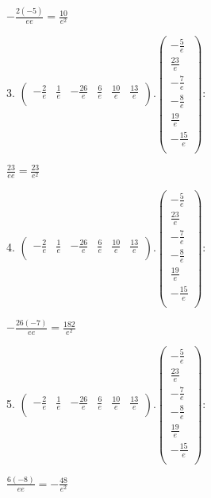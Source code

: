 \documentclass{article}
\begin{document}
$-\frac{2 (-5)}{e e}=\frac{10}{e^2}$

3. $\left(
\begin{array}{cccccc}
-\frac{2}{e} & \frac{1}{e} & -\frac{26}{e} & \frac{6}{e} & \frac{10}{e} & \frac{13}{e} \\
\end{array}
\right).\left(
\begin{array}{c}
-\frac{5}{e} \\
 \frac{23}{e} \\
 -\frac{7}{e} \\
 -\frac{8}{e} \\
 \frac{19}{e} \\
 -\frac{15}{e} \\
\end{array}
\right):$

$\frac{23}{e e}=\frac{23}{e^2}$

4. $\left(
\begin{array}{cccccc}
-\frac{2}{e} & \frac{1}{e} & -\frac{26}{e} & \frac{6}{e} & \frac{10}{e} & \frac{13}{e} \\
\end{array}
\right).\left(
\begin{array}{c}
-\frac{5}{e} \\
 \frac{23}{e} \\
 -\frac{7}{e} \\
 -\frac{8}{e} \\
 \frac{19}{e} \\
 -\frac{15}{e} \\
\end{array}
\right):$

$-\frac{26 (-7)}{e e}=\frac{182}{e^2}$

5. $\left(
\begin{array}{cccccc}
-\frac{2}{e} & \frac{1}{e} & -\frac{26}{e} & \frac{6}{e} & \frac{10}{e} & \frac{13}{e} \\
\end{array}
\right).\left(
\begin{array}{c}
-\frac{5}{e} \\
 \frac{23}{e} \\
 -\frac{7}{e} \\
 -\frac{8}{e} \\
 \frac{19}{e} \\
 -\frac{15}{e} \\
\end{array}
\right):$

$\frac{6 (-8)}{e e}=-\frac{48}{e^2}$
\end{document}

